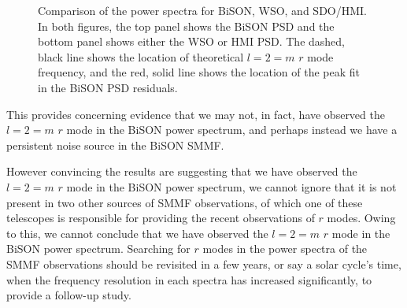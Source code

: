 \begin{figure}[!ht]
	\centering
	\qquad
	\caption{Comparison of the power spectra for BiSON, WSO, and SDO/HMI. In both figures, the top panel shows the BiSON PSD and the bottom panel shows either the WSO or HMI PSD. The dashed, black line shows the location of theoretical $l=2=m$ $r$ mode frequency, and the red, solid line shows the location of the peak fit in the BiSON PSD residuals.}  \label{fig:comparing_SMMF_PSDs}
\end{figure}

This provides concerning evidence that we may not, in fact, have observed the $l=2=m$ $r$ mode in the BiSON power spectrum, and perhaps instead we have a persistent noise source in the BiSON SMMF.

However convincing the results are suggesting that we have observed the $l=2=m$ $r$ mode in the BiSON power spectrum, we cannot ignore that it is not present in two other sources of SMMF observations, of which one of these telescopes is responsible for providing the recent observations of $r$ modes. Owing to this, we cannot conclude that we have observed the $l=2=m$ $r$ mode in the BiSON power spectrum. Searching for $r$ modes in the power spectra of the SMMF observations should be revisited in a few years, or say a solar cycle's time, when the frequency resolution in each spectra has increased significantly, to provide a follow-up study.



